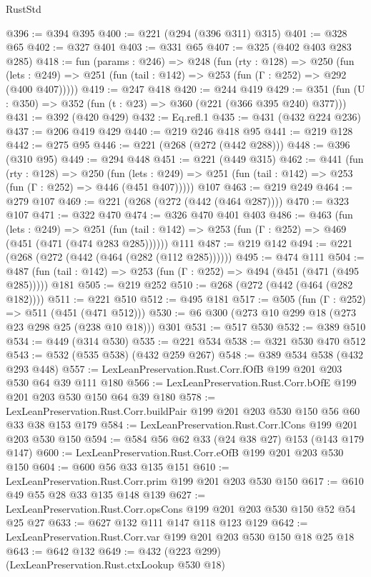 \begin{lexlean}{RustStd}
\begin{coremodule}
{\begin{coremodule}
{{{{{@396 := @394 @395
@400 := @221 (@294 (@396 @311) @315)
@401 := @328 @65
@402 := @327 @401
@403 := @331 @65
@407 := @325 (@402 @403 @283 @285)
@418 := fun (params : @246) =>
  @248
    (fun (rty : @128) =>
    @250
      (fun (lets : @249) => @251 (fun (tail : @142) => @253 (fun (Γ : @252) => @292 (@400 @407)))))
@419 := @247 @418
@420 := @244 @419
@429 := @351 (fun (U : @350) => @352 (fun (t : @23) => @360 (@221 (@366 @395 @240) @377)))
@431 := @392 (@420 @429)
@432 := Eq.refl.{1}
@435 := @431 (@432 @224 @236)
@437 := @206 @419 @429
@440 := @219 @246 @418 @95
@441 := @219 @128
@442 := @275 @95
@446 := @221 (@268 (@272 (@442 @288)))
@448 := @396 (@310 @95)
@449 := @294 @448
@451 := @221 (@449 @315)
@462 := @441
    (fun (rty : @128) =>
    @250
      (fun (lets : @249) => @251 (fun (tail : @142) => @253 (fun (Γ : @252) => @446 (@451 @407)))))
    @107
@463 := @219 @249
@464 := @279 @107
@469 := @221 (@268 (@272 (@442 (@464 @287))))
@470 := @323 @107
@471 := @322 @470
@474 := @326 @470 @401 @403
@486 := @463
    (fun (lets : @249) =>
    @251 (fun (tail : @142) => @253 (fun (Γ : @252) => @469 (@451 (@471 (@474 @283 @285))))))
    @111
@487 := @219 @142
@494 := @221 (@268 (@272 (@442 (@464 (@282 (@112 @285))))))
@495 := @474 @111
@504 := @487 (fun (tail : @142) => @253 (fun (Γ : @252) => @494 (@451 (@471 (@495 @285))))) @181
@505 := @219 @252
@510 := @268 (@272 (@442 (@464 (@282 @182))))
@511 := @221 @510
@512 := @495 @181
@517 := @505 (fun (Γ : @252) => @511 (@451 (@471 @512)))
@530 := @6 @300 (@273 @10 @299 @18 (@273 @23 @298 @25 (@238 @10 @18))) @301
@531 := @517 @530
@532 := @389 @510
@534 := @449 (@314 @530)
@535 := @221 @534
@538 := @321 @530 @470 @512
@543 := @532 (@535 @538) (@432 @259 @267)
@548 := @389 @534 @538 (@432 @293 @448)
@557 := LexLeanPreservation.Rust.Corr.fOfB @199 @201 @203 @530 @64 @39 @111 @180
@566 := LexLeanPreservation.Rust.Corr.bOfE @199 @201 @203 @530 @150 @64 @39 @180
@578 := LexLeanPreservation.Rust.Corr.buildPair @199 @201 @203 @530 @150 @56 @60 @33 @38 @153 @179
@584 := LexLeanPreservation.Rust.Corr.lCons @199 @201 @203 @530 @150
@594 := @584 @56 @62 @33 (@24 @38 @27) @153 (@143 @179 @147)
@600 := LexLeanPreservation.Rust.Corr.eOfB @199 @201 @203 @530 @150
@604 := @600 @56 @33 @135 @151
@610 := LexLeanPreservation.Rust.Corr.prim @199 @201 @203 @530 @150
@617 := @610 @49 @55 @28 @33 @135 @148 @139
@627 := LexLeanPreservation.Rust.Corr.opsCons @199 @201 @203 @530 @150 @52 @54 @25 @27
@633 := @627 @132 @111 @147 @118 @123 @129
@642 := LexLeanPreservation.Rust.Corr.var @199 @201 @203 @530 @150 @18 @25 @18
@643 := @642 @132
@649 := @432 (@223 @299) (LexLeanPreservation.Rust.ctxLookup @530 @18)
}}}}}
\end{coremodule}}
\end{coremodule}
\end{lexlean}
